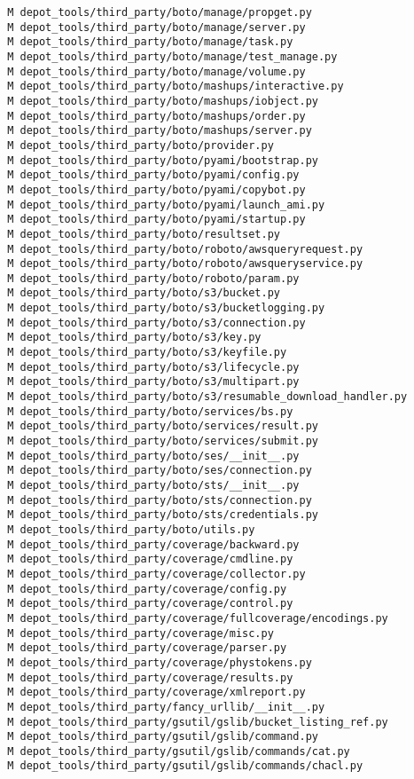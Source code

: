 \documentclass{article}
\begin{document}
\begin{verbatim}
 M depot_tools/third_party/boto/manage/propget.py
 M depot_tools/third_party/boto/manage/server.py
 M depot_tools/third_party/boto/manage/task.py
 M depot_tools/third_party/boto/manage/test_manage.py
 M depot_tools/third_party/boto/manage/volume.py
 M depot_tools/third_party/boto/mashups/interactive.py
 M depot_tools/third_party/boto/mashups/iobject.py
 M depot_tools/third_party/boto/mashups/order.py
 M depot_tools/third_party/boto/mashups/server.py
 M depot_tools/third_party/boto/provider.py
 M depot_tools/third_party/boto/pyami/bootstrap.py
 M depot_tools/third_party/boto/pyami/config.py
 M depot_tools/third_party/boto/pyami/copybot.py
 M depot_tools/third_party/boto/pyami/launch_ami.py
 M depot_tools/third_party/boto/pyami/startup.py
 M depot_tools/third_party/boto/resultset.py
 M depot_tools/third_party/boto/roboto/awsqueryrequest.py
 M depot_tools/third_party/boto/roboto/awsqueryservice.py
 M depot_tools/third_party/boto/roboto/param.py
 M depot_tools/third_party/boto/s3/bucket.py
 M depot_tools/third_party/boto/s3/bucketlogging.py
 M depot_tools/third_party/boto/s3/connection.py
 M depot_tools/third_party/boto/s3/key.py
 M depot_tools/third_party/boto/s3/keyfile.py
 M depot_tools/third_party/boto/s3/lifecycle.py
 M depot_tools/third_party/boto/s3/multipart.py
 M depot_tools/third_party/boto/s3/resumable_download_handler.py
 M depot_tools/third_party/boto/services/bs.py
 M depot_tools/third_party/boto/services/result.py
 M depot_tools/third_party/boto/services/submit.py
 M depot_tools/third_party/boto/ses/__init__.py
 M depot_tools/third_party/boto/ses/connection.py
 M depot_tools/third_party/boto/sts/__init__.py
 M depot_tools/third_party/boto/sts/connection.py
 M depot_tools/third_party/boto/sts/credentials.py
 M depot_tools/third_party/boto/utils.py
 M depot_tools/third_party/coverage/backward.py
 M depot_tools/third_party/coverage/cmdline.py
 M depot_tools/third_party/coverage/collector.py
 M depot_tools/third_party/coverage/config.py
 M depot_tools/third_party/coverage/control.py
 M depot_tools/third_party/coverage/fullcoverage/encodings.py
 M depot_tools/third_party/coverage/misc.py
 M depot_tools/third_party/coverage/parser.py
 M depot_tools/third_party/coverage/phystokens.py
 M depot_tools/third_party/coverage/results.py
 M depot_tools/third_party/coverage/xmlreport.py
 M depot_tools/third_party/fancy_urllib/__init__.py
 M depot_tools/third_party/gsutil/gslib/bucket_listing_ref.py
 M depot_tools/third_party/gsutil/gslib/command.py
 M depot_tools/third_party/gsutil/gslib/commands/cat.py
 M depot_tools/third_party/gsutil/gslib/commands/chacl.py

\end{verbatim}
\end{document}
